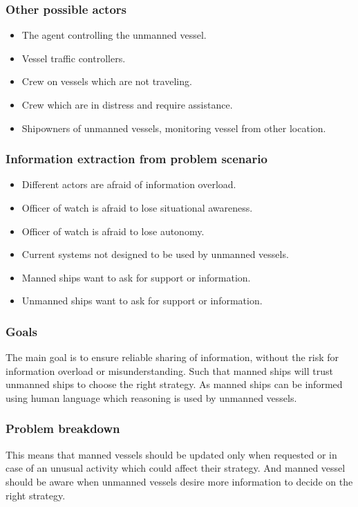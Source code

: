 \subsubsection{Other possible actors}
\begin{itemize}
	\item The agent controlling the unmanned vessel. 
	\item Vessel traffic controllers.
	\item Crew on vessels which are not traveling.
	\item Crew which are in distress and require assistance.
	\item Shipowners of unmanned vessels, monitoring vessel from other location.
\end{itemize}

\subsubsection{Information extraction from problem scenario}
\begin{itemize}
	\item Different actors are afraid of information overload.
	\item Officer of watch is afraid to lose situational awareness.
	\item Officer of watch is afraid to lose autonomy.
	\item Current systems not designed to be used by unmanned vessels.
	\item Manned ships want to ask for support or information.
	\item Unmanned ships want to ask for support or information.
\end{itemize}

\subsubsection{Goals}
The main goal is to ensure reliable sharing of information, without the risk for information overload or misunderstanding. Such that manned ships will trust unmanned ships to choose the right strategy. As manned ships can be informed using human language which reasoning is used by unmanned vessels.

\subsubsection{Problem breakdown}
This means that manned vessels should be updated only when requested or in case of an unusual activity which could affect their strategy. And manned vessel should be aware when unmanned vessels desire more information to decide on the right strategy.

